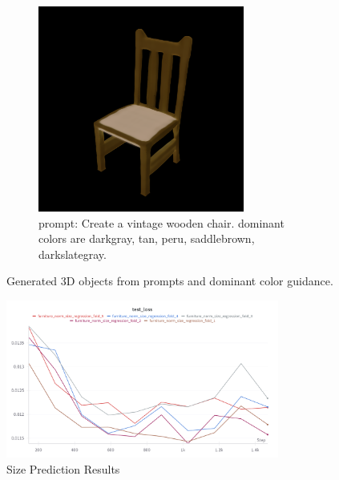 \documentclass[11pt]{article}
\begin{document}
\begin{figure}[htbp]
    \begin{subfigure}[t]{0.3\textwidth}
        \centering
        \includegraphics[width=\textwidth]{figures/vintage_furniture.png}
        \caption{prompt: Create a vintage wooden chair. dominant colors are darkgray, tan, peru, saddlebrown, darkslategray.}
        \label{fig:vintage_furniture}
    \end{subfigure}

    \caption{Generated 3D objects from prompts and dominant color guidance.}
    \label{fig:generated_3d_objects}
\end{figure}

\begin{figure}[htbp]
    \centering
    \includegraphics[width=0.8\textwidth]{figures/size_prediction_results.png}
    \caption{Size Prediction Results}
    \label{fig:size_prediction_results}
\end{figure}
\end{document}
